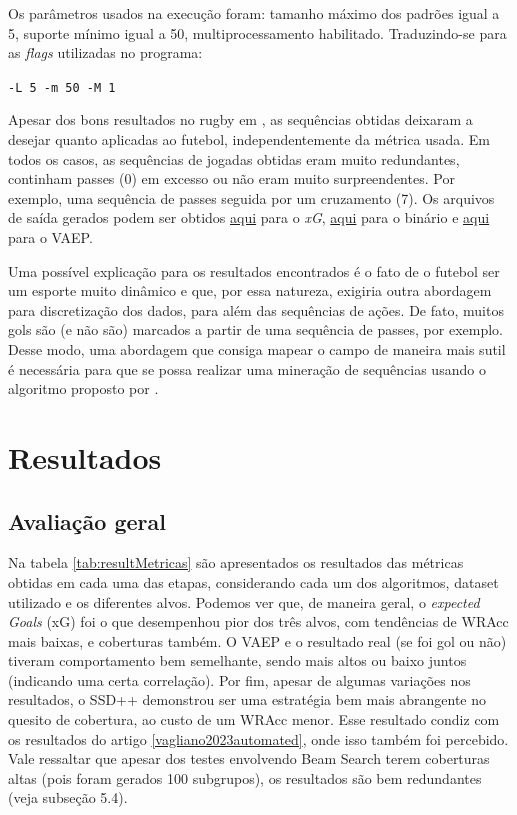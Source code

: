 \documentclass{article}
\begin{document}
Os parâmetros usados na execução foram: tamanho máximo dos padrões igual a 5,
suporte mínimo igual a 50, multiprocessamento habilitado. Traduzindo-se para as
\textit{flags} utilizadas no programa:

\begin{center}
	\texttt{-L 5 -m 50 -M 1}
\end{center}

Apesar dos bons resultados no rugby em \cite{bunker2021supervised}, as sequências obtidas deixaram a desejar
quanto aplicadas ao futebol, independentemente da métrica usada. Em todos os
casos, as sequências de jogadas obtidas eram muito redundantes, continham passes
(0) em excesso ou não eram muito surpreendentes. Por exemplo, uma sequência de
passes seguida por um cruzamento (7). Os arquivos de saída gerados podem ser
obtidos
\href{https://github.com/lframosferreira/projeto-ad/blob/main/results/supervised-sequential-pattern-rugby/results_xg.csv}{aqui}
para o \textit{xG},
\href{https://github.com/lframosferreira/projeto-ad/blob/main/results/supervised-sequential-pattern-rugby/results_binary.csv}{aqui}
para o binário e
\href{https://github.com/lframosferreira/projeto-ad/blob/main/results/supervised-sequential-pattern-rugby/results_vaep.csv}{aqui}
para o VAEP.

Uma possível explicação para os resultados encontrados é o fato de o futebol ser
um esporte muito dinâmico e que, por essa natureza, exigiria outra abordagem
para discretização dos dados, para além das sequências de ações. De fato, muitos
gols são (e não são) marcados a partir de uma sequência de passes, por exemplo.
Desse modo, uma abordagem que consiga mapear o campo de maneira mais sutil é
necessária para que se possa realizar uma mineração de sequências usando o
algoritmo proposto por \cite{bunker2021supervised}.

\section{Resultados}

\subsection{Avaliação geral}

Na tabela \ref{tab:resultMetricas} são apresentados os resultados das métricas obtidas 
em cada uma das etapas, considerando cada um dos algoritmos, dataset utilizado e os diferentes 
alvos. Podemos ver que, de maneira geral, o \textit{expected Goals} (xG) foi o que desempenhou 
pior dos três alvos, com tendências de WRAcc mais baixas, e coberturas também. O VAEP e o resultado 
real (se foi gol ou não) tiveram comportamento bem semelhante, sendo mais altos ou baixo juntos 
(indicando uma certa correlação). Por fim, apesar de algumas variações nos resultados, o SSD++ 
demonstrou ser uma estratégia bem  mais abrangente no quesito de cobertura, ao custo de um WRAcc 
menor. Esse resultado condiz com os resultados do artigo \ref{vagliano2023automated}, onde isso 
também foi percebido. Vale ressaltar que apesar dos testes envolvendo Beam Search terem coberturas 
altas (pois foram gerados 100 subgrupos), os resultados são bem redundantes (veja subseção 5.4).
\end{document}
